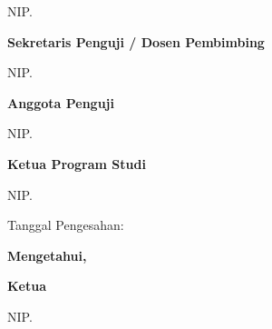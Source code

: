 {\begin{center}
\begin{singlespace}
    NIP. \NIPketuapenguji\par
    \vspace{\baselineskip}
    \textbf{\selectfont Sekretaris Penguji / Dosen Pembimbing}\par
    \vspace{2\baselineskip}
    \pembimbing\par
    NIP. \NIPpembimbing\par
    \vspace{\baselineskip}
    \textbf{\selectfont Anggota Penguji}\par
    \vspace{2\baselineskip}
    \anggotapenguji\par
    NIP. \NIPanggotapenguji\par
    \vspace{2\baselineskip}
    \textbf{\selectfont Ketua Program Studi \prodi}\par
    \vspace{2\baselineskip}
    \koorprodi\par
    NIP. \NIPKaprodi\par
    \vspace{\baselineskip}
    \hspace{2cm}Tanggal Pengesahan: \underline{\hspace{2.5cm}}\par
    \textbf{\selectfont Mengetahui,}\par
    \textbf{\selectfont Ketua \departemen}\par
    \vspace{3\baselineskip}
    \koordepartemen\par
    NIP. \NIPkadep\par
    \end{singlespace}
    \end{center}
}

\restoregeometry